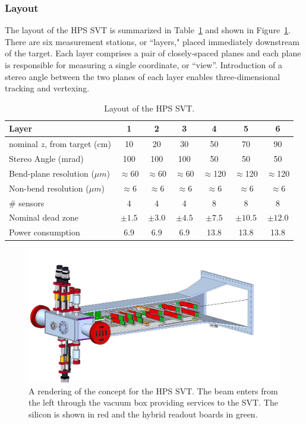 \subsubsection{Layout}

The layout of the HPS SVT is summarized in Table~\ref{table:svt_layout} and shown in Figure~\ref{figure:svt_layout}. There are six measurement stations, or ``layers," placed immediately downstream of the target. Each layer comprises a pair of closely-spaced planes and each plane is responsible for measuring a single coordinate, or ``view''. Introduction of a stereo angle between the two planes of each layer enables three-dimensional tracking and vertexing.
\begin{table}[h]
\begin{center}
\begin{tabular}{lcccccc}   
\hline \hline 
    Layer & 1 & 2 & 3 & 4 & 5 & 6 \\      
\hline
    nominal $z$, from target (cm)  & 10 & 20 & 30 & 50 & 70  & 90 \\ 
    Stereo Angle (mrad)  & 100 & 100 & 100 & 50 & 50 & 50 \\ 
    Bend-plane resolution ($\mu m$)  & $\approx$60 & $\approx$60 & $\approx$60 & $\approx$120 & $\approx$120 & $\approx$120 \\ 
    Non-bend resolution ($\mu m$)  & $\approx$6 & $\approx$6 & $\approx$6 & $\approx$6 & $\approx$6  & $\approx$6 \\ 
    \# sensors  & 4 & 4 & 4 & 8 & 8 & 8 \\ 
    Nominal dead zone  & $\pm1.5$  & $\pm3.0$  & $\pm4.5$  & $\pm7.5$  & $\pm10.5$ & $\pm12.0$  \\ 
    Power consumption & 6.9 & 6.9 & 6.9 & 13.8 & 13.8 & 13.8 \\
\hline \hline
\end{tabular}
\caption[]{Layout of the HPS SVT. }
\label{table:svt_layout} 
\end{center}
\end{table}
\begin{figure}[ht]
    \includegraphics[width=\textwidth]{svt/figures/10dec6.jpg}
\caption{\small{A rendering of the concept for the HPS SVT.  The beam enters from the left through the vacuum box providing services to the SVT.  The silicon is shown in red and the hybrid readout boards in green.} }
\label{figure:svt_layout}
\end{figure}

